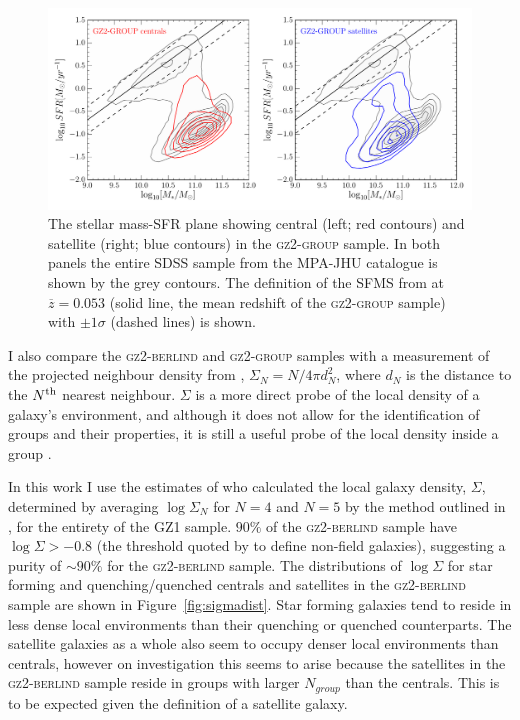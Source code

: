 \begin{figure}
\centering
\includegraphics[width=\textwidth]{environment/sfr_mass_quenched_centrals_satellites_gz2_group.pdf}
\caption[Stellar mass-SFR plane for the centrals and satellites of the \textsc{gz2-group} sample]{The stellar mass-SFR plane showing central (left; red contours) and satellite (right; blue contours) in the \textsc{gz2-group} sample. In both panels the entire SDSS sample from the MPA-JHU catalogue is shown by the grey contours. The definition of the SFMS from \cite{peng10} at $\overline{z} = 0.053$ (solid line, the mean redshift of the \textsc{gz2-group} sample) with $\pm1\sigma$ (dashed lines) is shown.}
\label{fig:sfrmass}
\end{figure}


I also compare the \textsc{gz2-berlind} and \textsc{gz2-group} samples with a measurement of the projected neighbour density from \cite{Baldry06}, $\Sigma_N = N/4\pi d_N^2$, where $d_N$ is the distance to the $N^{\rm{th}}$ nearest neighbour. $\Sigma$ is a more direct probe of the local density of a galaxy's environment, and although it does not allow for the identification of groups and their properties, it is still a useful probe of the local density inside a group  \cite[see][for a comparison of various environment parametrisations]{muldrew12}.

In this work I use the estimates of \cite{Bamford09} who calculated the local galaxy density, $\Sigma$, determined by averaging $\log\Sigma_N$ for $N = 4$ and $N=5$ by the method outlined in \citet{Baldry06}, for the entirety of the GZ1 sample. $90\%$ of the \textsc{gz2-berlind} sample have $\log\Sigma > -0.8$ (the threshold quoted by \citealt{Baldry06} to define non-field galaxies), suggesting a purity of $\sim90\%$ for the \textsc{gz2-berlind} sample. The distributions of $\log\Sigma$ for star forming and quenching/quenched centrals and satellites in the \textsc{gz2-berlind} sample are shown in Figure~\ref{fig:sigmadist}. Star forming galaxies tend to reside in less dense local environments than their quenching or quenched counterparts. The satellite galaxies as a whole also seem to occupy denser local environments than centrals, however on investigation this seems to arise because the satellites in the \textsc{gz2-berlind} sample reside in groups with larger $N_{group}$ than the centrals. This is to be expected given the definition of a satellite galaxy. 

